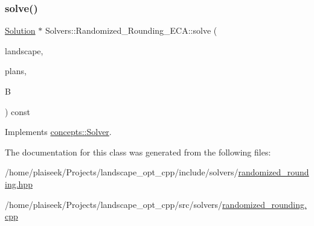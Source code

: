 \mbox{\label{class_solvers_1_1_randomized___rounding___e_c_a_a2b2c1f0da1e047a5add3fd1bb5e6f0e8}} 
\subsubsection{\texorpdfstring{solve()}{solve()}}
{\footnotesize\ttfamily \hyperlink{class_solution}{Solution} $\ast$ Solvers\+::\+Randomized\+\_\+\+Rounding\+\_\+\+E\+C\+A\+::solve (\begin{DoxyParamCaption}\item[{const \hyperlink{class_landscape}{Landscape} \&}]{landscape,  }\item[{const \hyperlink{class_restoration_plan}{Restoration\+Plan} \&}]{plans,  }\item[{const double}]{B }\end{DoxyParamCaption}) const\hspace{0.3cm}{\ttfamily [virtual]}}



Implements \hyperlink{classconcepts_1_1_solver_af323ad29df1e7b87facd7dc007568c80}{concepts\+::\+Solver}.



The documentation for this class was generated from the following files\+:\begin{DoxyCompactItemize}
\item 
/home/plaiseek/\+Projects/landscape\+\_\+opt\+\_\+cpp/include/solvers/\hyperlink{randomized__rounding_8hpp}{randomized\+\_\+rounding.\+hpp}\item 
/home/plaiseek/\+Projects/landscape\+\_\+opt\+\_\+cpp/src/solvers/\hyperlink{randomized__rounding_8cpp}{randomized\+\_\+rounding.\+cpp}\end{DoxyCompactItemize}
